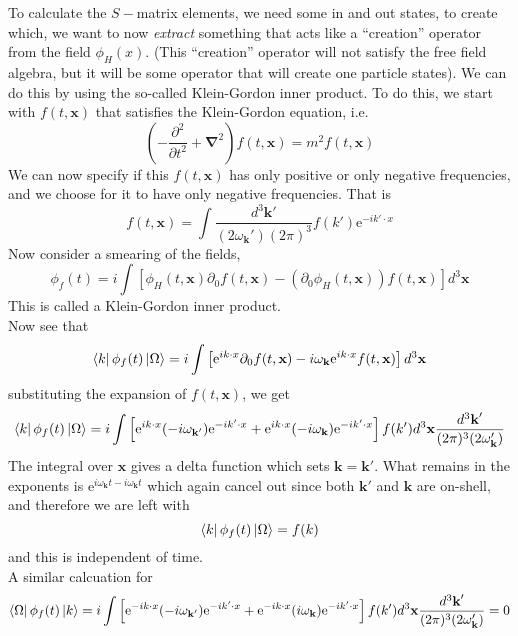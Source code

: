 \documentclass[11pt, notitlepage]{report}
\newcommand{\del}{\partial}
\newcommand{\e}{\mathrm{e}}
\newcommand{\w}{\omega}
\numberwithin{equation}{section}
\begin{document}
To calculate the \(S-\)matrix elements, we need some in and out states, to create which, we want to now \textit{extract} something that acts like a ``creation'' operator from the field \(\phi_H(x)\). (This ``creation'' operator will not satisfy the free field algebra, but it will be some operator that will create one particle states). We can do this by using the so-called Klein-Gordon inner product. To do this, we start with \(f(t, \textbf{x})\) that satisfies the Klein-Gordon equation, i.e. 
\begin{equation*}
    \left(-\frac{\del^2}{\del t^2} + \mathbf{\nabla}^2\right)f(t, \textbf{x}) = m^2f(t, \textbf{x})
\end{equation*}
We can now specify if this \(f(t, \textbf{x})\) has only positive or only negative frequencies, and we choose for it to have only negative frequencies. That is 
\begin{equation*}
    f(t, \textbf{x}) = \int \frac{d^3\textbf{k}'}{(2\w_\textbf{k}')(2\pi)^3} f({k}') \e^{-ik'\cdot x}
\end{equation*}
Now consider a smearing of the fields,
\begin{equation*}
    \phi_f(t) = i \int\left[ \phi_H(t, \textbf{x}) \del_0 f(t, \textbf{x}) - \left( \del_0 \phi_H(t, \textbf{x}) \right) f(t, \textbf{x})  \right]d^3\textbf{x}
\end{equation*}
This is called a Klein-Gordon inner product. \\

Now see that 
\begin{equation*}
    \bra{k}\phi_f(t)\ket{\Omega} = i \int \left[  \e^{ik\cdot x} \del_0f(t, \textbf{x}) - i\w_\textbf{k}\e^{ik\cdot x} f(t, \textbf{x})    \right]d^3\textbf{x}
\end{equation*}
substituting the expansion of \(f(t, \textbf{x})\), we get 
\begin{equation*}
    \bra{k}\phi_f(t)\ket{\Omega} = i\int \left[ \e^{ik\cdot x} (-i\w_{\textbf{k}'}) \e^{-ik'\cdot x} + \e^{ik\cdot x} (-i\w_\textbf{k})   \e^{-ik'\cdot x} \right] f({k}') d^3\textbf{x} \frac{d^3\textbf{k}'}{(2\pi)^3(2\w_\textbf{k}')}
\end{equation*}
The integral over \(\textbf{x}\) gives a delta function which sets \(\textbf{k} = \textbf{k}'\). What remains in the exponents is \(\e^{i\w_\textbf{k}t - i\w_\textbf{k}t}\) which again cancel out since both \(\textbf{k}'\) and \(\textbf{k}\) are on-shell, and therefore we are left with 
\begin{equation*}
    \bra{k}\phi_f(t)\ket{\Omega} =  f({k}) 
\end{equation*}
and this is independent of time.\\
A similar calcuation for 
\begin{equation*}
    \bra{\Omega}\phi_f(t)\ket{k}  = i\int \left[ \e^{-ik\cdot x} (-i\w_{\textbf{k}'}) \e^{-ik'\cdot x} + \e^{-ik\cdot x} (i\w_\textbf{k})   \e^{-ik'\cdot x} \right] f({k}') d^3\textbf{x} \frac{d^3\textbf{k}'}{(2\pi)^3(2\w_\textbf{k}')} = 0
\end{equation*}
\end{document}
